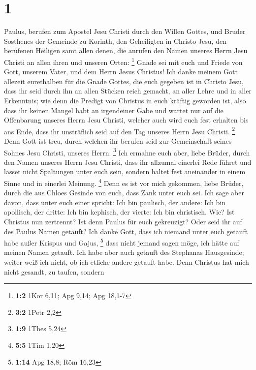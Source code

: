 \hypertarget{section}{%
\section{1}\label{section}}

 Paulus, berufen zum Apostel Jesu Christi durch den Willen
Gottes, und Bruder Sosthenes  der Gemeinde zu Korinth, den
Geheiligten in Christo Jesu, den berufenen Heiligen samt allen denen,
die anrufen den Namen unseres Herrn Jesu Christi an allen ihren und
unseren Orten: \footnote{\textbf{1:2} 1Kor 6,11; Apg 9,14; Apg 18,1-7}
 Gnade sei mit euch und Friede von Gott, unserem Vater,
und dem Herrn Jesus Christus!  Ich danke meinem Gott
allezeit eurethalben für die Gnade Gottes, die euch gegeben ist in
Christo Jesu,  dass ihr seid durch ihn an allen Stücken
reich gemacht, an aller Lehre und in aller Erkenntnis; 
wie denn die Predigt von Christus in euch kräftig geworden ist,
 also dass ihr keinen Mangel habt an irgendeiner Gabe und
wartet nur auf die Offenbarung unseres Herrn Jesu Christi,
 welcher auch wird euch fest erhalten bis ans Ende, dass
ihr unsträflich seid auf den Tag unseres Herrn Jesu Christi. \footnote{\textbf{3:2}
  1Petr 2,2}  Denn Gott ist treu, durch welchen ihr
berufen seid zur Gemeinschaft seines Sohnes Jesu Christi, unseres Herrn.
\footnote{\textbf{1:9} 1Thes 5,24}  Ich ermahne euch
aber, liebe Brüder, durch den Namen unseres Herrn Jesu Christi, dass ihr
allzumal einerlei Rede führet und lasset nicht Spaltungen unter euch
sein, sondern haltet fest aneinander in einem Sinne und in einerlei
Meinung. \footnote{\textbf{5:5} 1Tim 1,20}  Denn es ist
vor mich gekommen, liebe Brüder, durch die aus Chloes Gesinde von euch,
dass Zank unter euch sei.  Ich sage aber davon, dass
unter euch einer spricht: Ich bin paulisch, der andere: Ich bin
apollisch, der dritte: Ich bin kephisch, der vierte: Ich bin christisch.
 Wie? Ist Christus nun zertrennt? Ist denn Paulus für
euch gekreuzigt? Oder seid ihr auf des Paulus Namen getauft?
 Ich danke Gott, dass ich niemand unter euch getauft habe
außer Krispus und Gajus, \footnote{\textbf{1:14} Apg 18,8; Röm 16,23}
 dass nicht jemand sagen möge, ich hätte auf meinen Namen
getauft.  Ich habe aber auch getauft des Stephanas
Hausgesinde; weiter weiß ich nicht, ob ich etliche andere getauft habe.
 Denn Christus hat mich nicht gesandt, zu taufen, sondern
